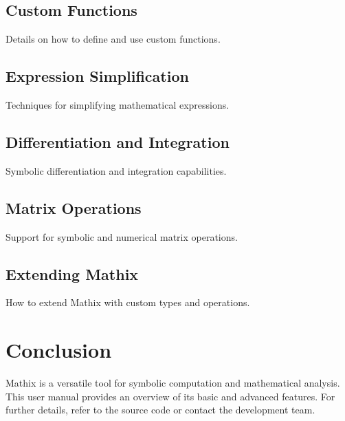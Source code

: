 \documentclass[a4paper,12pt]{article}
\begin{document}
\subsection{Custom Functions}
Details on how to define and use custom functions.

\subsection{Expression Simplification}
Techniques for simplifying mathematical expressions.

\subsection{Differentiation and Integration}
Symbolic differentiation and integration capabilities.

\subsection{Matrix Operations}
Support for symbolic and numerical matrix operations.

\subsection{Extending Mathix}
How to extend Mathix with custom types and operations.

\section{Conclusion}
Mathix is a versatile tool for symbolic computation and mathematical analysis. This user manual provides an overview of its basic and advanced features. For further details, refer to the source code or contact the development team.
\end{document}
